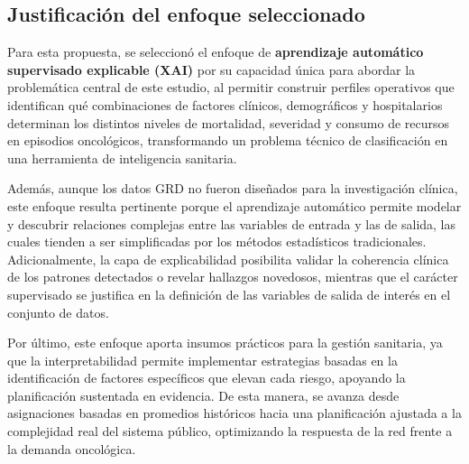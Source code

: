 \subsection{Justificación del enfoque seleccionado}

Para esta propuesta, se seleccionó el enfoque de \textbf{aprendizaje automático supervisado explicable (XAI)} por su capacidad única para abordar la problemática central de este estudio, al permitir construir perfiles operativos que identifican qué combinaciones de factores clínicos, demográficos y hospitalarios determinan los distintos niveles de mortalidad, severidad y consumo de recursos en episodios oncológicos, transformando un problema técnico de clasificación en una herramienta de inteligencia sanitaria. 

Además, aunque los datos GRD no fueron diseñados para la investigación clínica, este enfoque resulta pertinente porque el aprendizaje automático permite modelar y descubrir relaciones complejas entre las variables de entrada y las de salida, las cuales tienden a ser simplificadas por los métodos estadísticos tradicionales. Adicionalmente, la capa de explicabilidad posibilita validar la coherencia clínica de los patrones detectados o revelar hallazgos novedosos, mientras que el carácter supervisado se justifica en la definición de las variables de salida de interés en el conjunto de datos.

Por último, este enfoque aporta insumos prácticos para la gestión sanitaria, ya que la interpretabilidad permite implementar estrategias basadas en la identificación de factores específicos que elevan cada riesgo, apoyando la planificación sustentada en evidencia. De esta manera, se avanza desde asignaciones basadas en promedios históricos hacia una planificación ajustada a la complejidad real del sistema público, optimizando la respuesta de la red frente a la demanda oncológica.

